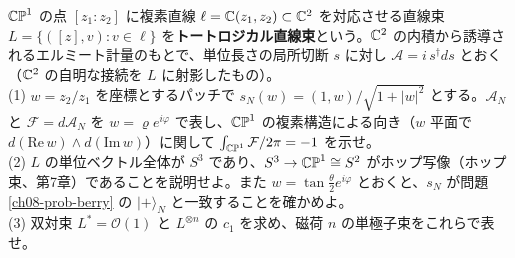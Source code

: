 \begin{problem}[難易度 B]\label{ch08-prob-hopf}
$\mathbb{CP}^1$ の点 $[z_1:z_2]$ に複素直線 $\ell=\mathbb{C}(z_1,z_2)\subset\mathbb{C}^2$ を対応させる直線束 $L=\{([z],v):v\in\ell\}$ を\textbf{トートロジカル直線束}という。$\mathbb{C}^2$ の内積から誘導されるエルミート計量のもとで、単位長さの局所切断 $s$ に対し $\mathcal A=i\,s^\dagger ds$ とおく（$\mathbb{C}^2$ の自明な接続を $L$ に射影したもの）。\\
(1) $w=z_2/z_1$ を座標とするパッチで $s_N(w)=(1,w)/\sqrt{1+\lvert w\rvert^2}$ とする。$\mathcal A_N$ と $\mathcal F=d\mathcal A_N$ を $w=\varrho e^{i\varphi}$ で表し、$\mathbb{CP}^1$ の複素構造による向き（$w$ 平面で $d(\mathrm{Re}\,w)\wedge d(\mathrm{Im}\,w)$）に関して $\int_{\mathbb{CP}^1}\mathcal F/2\pi=-1$ を示せ。\\
(2) $L$ の単位ベクトル全体が $S^3$ であり、$S^3\to\mathbb{CP}^1\cong S^2$ がホップ写像（ホップ束、第7章）であることを説明せよ。また $w=\tan\frac\theta2e^{i\varphi}$ とおくと、$s_N$ が問題 \ref{ch08-prob-berry} の $\lvert+\rangle_N$ と一致することを確かめよ。\\
(3) 双対束 $L^*=\mathcal O(1)$ と $L^{\otimes n}$ の $c_1$ を求め、磁荷 $n$ の単極子束をこれらで表せ。
\end{problem}

